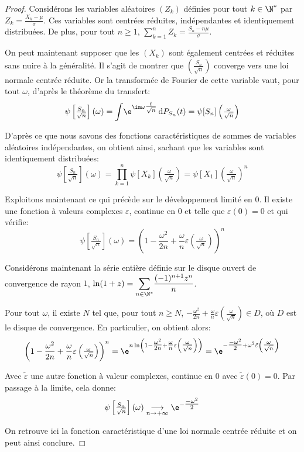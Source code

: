 \begin{proof}
Considérons les variables aléatoires $(Z_k)$ définies pour tout $k \in \N^*$ par $Z_k = \frac{X_k- \mu}{\sigma}$. Ces variables sont centrées réduites, indépendantes et identiquement distribuées. De plus, pour tout $n \geq 1$, $\displaystyle{\sum_{k=1}^n} Z_k = \frac{S_n - n \mu}{\sigma}$.

\medskip
On peut maintenant supposer que les $(X_k)$ sont également centrées et réduites sans nuire à la généralité. Il s'agit de montrer que $\left (\frac{S_n}{\sqrt{n}}\right )$ converge vers une loi normale centrée réduite. Or la transformée de Fourier de cette variable vaut, pour tout $\omega$, d'après le théorème du transfert:
\[
\psi\left [ \tfrac{S_n}{\sqrt{n}}\right ](\omega) = \displaystyle{\int} \e^{\im \omega \tfrac{t}{\sqrt{n}}} \, \mathrm d P_{S_n} (t) = \psi[S_n] \left ( \tfrac{\omega}{\sqrt{n}}\right )
\]

D'après ce que nous savons des fonctions caractéristiques de sommes de variables aléatoires indépendantes, on obtient ainsi, sachant que les variables sont identiquement distribuées:
\[
\psi\left [ \tfrac{S_n}{\sqrt{n}}\right ](\omega) = \displaystyle{\prod_{k=1}^n} \psi[X_k]\left ( \tfrac{\omega}{\sqrt{n}}\right ) = \psi[X_1]\left ( \tfrac{\omega}{\sqrt{n}}\right )^n
\]

Exploitons maintenant ce qui précède sur le développement limité en $0$. Il existe une fonction à valeurs complexes $\varepsilon$, continue en $0$ et telle que $\varepsilon(0) = 0$ et qui vérifie:
\[
\psi\left [ \tfrac{S_n}{\sqrt{n}}\right ](\omega) = \left ( 1-\frac{\omega^2}{2n} + \frac{\omega}{n} \varepsilon\left ( \tfrac{\omega}{\sqrt{n}}\right )\right )^n
\]

Considérons maintenant la série entière définie sur le disque ouvert de convergence de rayon $1$, $\ln(1+z) = \displaystyle{\sum \limits_{n \in \N^*}} \frac{(-1)^{n+1} z^n}{n}$.

Pour tout $\omega$, il existe $N$ tel que, pour tout $n \geq N$, $-\frac{\omega^2}{2n} + \frac{\omega}{n} \varepsilon\left ( \tfrac{\omega}{\sqrt{n}}\right ) \in D$, où $D$ est le disque de convergence. En particulier, on obtient alors:
\[
\left ( 1-\frac{\omega^2}{2n} + \frac{\omega}{n} \varepsilon\left ( \tfrac{\omega}{\sqrt{n}}\right )\right )^n = \e^{n \ln \left ( 1-\tfrac{\omega^2}{2n} + \tfrac{\omega}{n} \varepsilon\left ( \tfrac{\omega}{\sqrt{n}}\right ) \right )} = \e^{-\tfrac{-\omega^2}{2} + \omega^2 \tilde{\varepsilon}\left ( \tfrac{\omega}{\sqrt{n}}\right ) }
\]

Avec $\tilde{\varepsilon}$ une autre fonction à valeur complexes, continue en $0$ avec $\tilde{\varepsilon}(0) = 0$. Par passage à la limite, cela donne:
\[
\psi\left [ \tfrac{S_n}{\sqrt{n}}\right ](\omega) \underset{n \to +\infty}{\longrightarrow} \e^{-\tfrac{-\omega^2}{2}}
\]

On retrouve ici la fonction caractéristique d'une loi normale centrée réduite et on peut ainsi conclure.
\end{proof}


